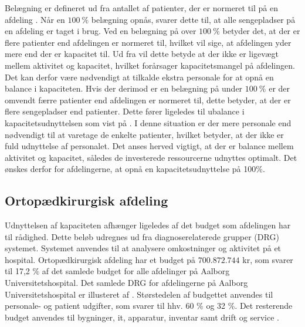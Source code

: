 Belægning er defineret ud fra antallet af patienter, der er normeret til på en afdeling \cite{Heidmann2014}. Når en $100~\%$ belægning opnås, svarer dette til, at alle sengepladser på en afdeling er taget i brug. Ved en belægning på over $100~\%$ betyder det, at der er flere patienter end afdelingen er normeret til, hvilket vil sige, at afdelingen yder mere end der er kapacitet til. Ud fra  vil dette betyde at der ikke er ligevægt mellem aktivitet og kapacitet, hvilket forårsager kapacitetsmangel på afdelingen. Det kan derfor være nødvendigt at tilkalde ekstra personale for at opnå en balance i kapaciteten.\cite{Pauly1986}
Hvis der derimod er en belægning på under $100~\%$ er der omvendt færre patienter end afdelingen er normeret til, dette betyder, at der er flere sengepladser end patienter. Dette fører ligeledes til ubalance i kapacitetsudnyttelsen som vist på . I denne situation er der mere personale end nødvendigt til at varetage de enkelte patienter, hvilket betyder, at der ikke er fuld udnyttelse af personalet.\cite{Pauly1986} 
Det anses herved vigtigt, at der er balance mellem aktivitet og kapacitet, således de investerede ressourcerne udnyttes optimalt. Det ønskes derfor for afdelingerne, at opnå en kapacitetsudnyttelse på 100\%.   

\subsection{Ortopædkirurgisk afdeling}
Udnyttelsen af kapaciteten afhænger ligeledes af det budget som afdelingen har til rådighed. Dette beløb udregnes ud fra diagnoserelaterede grupper (DRG) systemet. Systemet anvendes til at analysere omkostninger og aktivitet på et hospital.\cite{DRG2016} Ortopædkirurgisk afdeling har et budget på $700.872.744$ kr, som svarer til 17,2 \% af det samlede budget for alle afdelinger på Aalborg Universitetshospital. Det samlede DRG for afdelingerne på Aalborg Universitetshospital er illusteret af .\cite{Rasmussen2016}
Størstedelen af budgettet anvendes til personale- og patient udgifter, som svarer til hhv. 60 \% og 32 \%. Det resterende budget anvendes til bygninger, it, apparatur, inventar samt drift og service \cite{Nøgletal2016}. 




